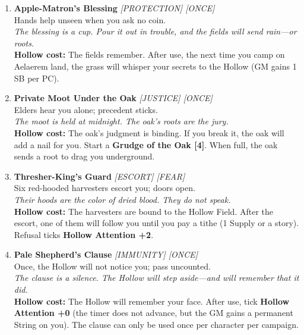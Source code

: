 \begin{enumerate}
\item[J] \textbf{Apple-Matron's Blessing} \hfill \textit{[PROTECTION] [ONCE]} \\
  Hands help unseen when you ask no coin. \\
  \textit{The blessing is a cup. Pour it out in trouble, and the fields will send rain---or roots.} \\
  \textbf{Hollow cost:} The fields remember. After use, the next time you camp on Aelaerem land, the grass will whisper your secrets to the Hollow (GM gains 1 SB per PC).

\item[Q] \textbf{Private Moot Under the Oak} \hfill \textit{[JUSTICE] [ONCE]} \\
  Elders hear you alone; precedent sticks. \\
  \textit{The moot is held at midnight. The oak's roots are the jury.} \\
  \textbf{Hollow cost:} The oak's judgment is binding. If you break it, the oak will add a nail for you. Start a \textbf{Grudge of the Oak [4]}. When full, the oak sends a root to drag you underground.

\item[K] \textbf{Thresher-King's Guard} \hfill \textit{[ESCORT] [FEAR]} \\
  Six red-hooded harvesters escort you; doors open. \\
  \textit{Their hoods are the color of dried blood. They do not speak.} \\
  \textbf{Hollow cost:} The harvesters are bound to the Hollow Field. After the escort, one of them will follow you until you pay a tithe (1 Supply or a story). Refusal ticks \textbf{Hollow Attention +2}.

\item[A] \textbf{Pale Shepherd's Clause} \hfill \textit{[IMMUNITY] [ONCE]} \\
  Once, the Hollow will not notice you; pass uncounted. \\
  \textit{The clause is a silence. The Hollow will step aside---and will remember that it did.} \\
  \textbf{Hollow cost:} The Hollow will remember your face. After use, tick \textbf{Hollow Attention +0} (the timer does not advance, but the GM gains a permanent String on you). The clause can only be used once per character per campaign.
\end{enumerate}

